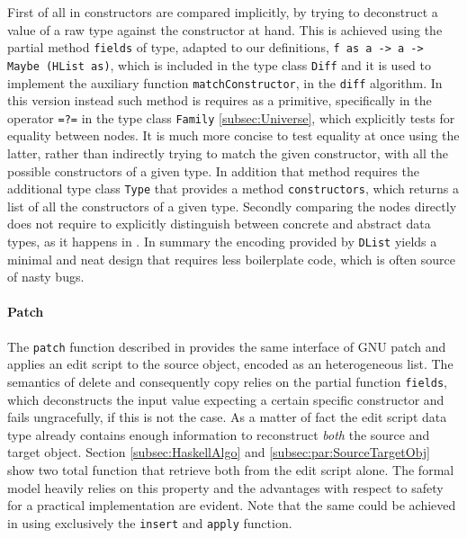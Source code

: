 \documentclass[../Thesis.tex]{subfiles}
\begin{document}
	First of all in \cite{Lemp09} constructors are compared implicitly,
	by trying to deconstruct a value of a raw type against the constructor
	at hand. This is achieved using the partial method \texttt{fields} of type,
	adapted to our definitions, \texttt{f as a -> a -> Maybe (HList as)},
	which is included in the type class \texttt{Diff} and it is used to
	implement the auxiliary function \texttt{matchConstructor}, in the
	\texttt{diff} algorithm.
	In this version instead such method is requires as a primitive,
	specifically in the operator \texttt{=?=} in the type class \texttt{Family} 
	\ref{subsec:Universe}, which explicitly tests for equality 
	between nodes.
	It is much more concise to test equality at once using the latter,
	rather than indirectly trying to match the given constructor,
	with all the possible constructors of a given type.
	In addition that method requires the additional type class \texttt{Type} that 
	provides a method \texttt{constructors}, which 
	returns a list of all the constructors of a given type.
	Secondly comparing the nodes directly does not require to 
	explicitly distinguish between concrete and abstract data types, as 
	it happens in \cite{Lemp09}.
	In summary the encoding provided by \texttt{DList} yields a
	minimal and neat design that requires less boilerplate code,
	which is often source of nasty bugs.
	
	\paragraph{Patch}
	The \texttt{patch} function described in \cite{Lemp09} provides the 
	same interface of GNU patch and applies an edit script 
	to the source object, encoded as an heterogeneous list.
	The semantics of delete and consequently copy relies
	on the partial function \texttt{fields}, which deconstructs the input
	value expecting a certain specific constructor and fails ungracefully,
	if this is not the case.
	As a matter of fact the edit script data type already contains enough 
	information to reconstruct \emph{both} the source and target object.
	Section \ref{subsec:HaskellAlgo} and \ref{subsec:par:SourceTargetObj} show
	two total function that retrieve both from the edit script alone.
	The formal model heavily relies on this property and the advantages with respect to safety for a 
	practical implementation	are evident.
	Note that 	the same could be achieved in \cite{Lemp09} using
	exclusively the \texttt{insert} and \texttt{apply} function.
\end{document}
